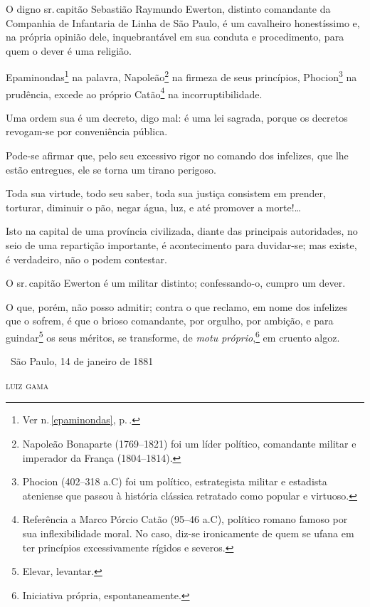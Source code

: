 O digno sr.\,capitão Sebastião Raymundo Ewerton, distinto comandante da
Companhia de Infantaria de Linha de São Paulo, é um cavalheiro
honestíssimo e, na própria opinião dele, inquebrantável em sua conduta e
procedimento, para quem o dever é uma religião.

Epaminondas\footnote{Ver n.\,\ref{epaminondas}, p.\,\pageref{epaminondas}.} na palavra, Napoleão\footnote{Napoleão Bonaparte 
  (1769--1821) foi um líder político, comandante militar e imperador da
  França (1804--1814).} na firmeza de seus princípios, Phocion\footnote{
  Phocion (402--318 a.C) foi um político, estrategista militar e
  estadista ateniense que passou à história clássica retratado como
  popular e virtuoso.} na prudência, excede ao próprio Catão\footnote{
  Referência a Marco Pórcio Catão (95--46 a.C), político romano famoso
  por sua inflexibilidade moral. No caso, diz-se ironicamente de quem se
  ufana em ter princípios excessivamente rígidos e severos.} na
incorruptibilidade.

Uma ordem sua é um decreto, digo mal: é uma lei sagrada, porque os
decretos revogam-se por conveniência pública.

Pode-se afirmar que, pelo seu excessivo rigor no comando dos infelizes,
que lhe estão entregues, ele se torna um tirano perigoso.

Toda sua virtude, todo seu saber, toda sua justiça consistem em prender,
torturar, diminuir o pão, negar água, luz, e até promover a
morte!\ldots{}

Isto na capital de uma província civilizada, diante das principais
autoridades, no seio de uma repartição importante, é acontecimento para
duvidar-se; mas existe, é verdadeiro, não o podem contestar.

O sr.\,capitão Ewerton é um militar distinto; confessando-o, cumpro um
dever.

O que, porém, não posso admitir; contra o que reclamo, em nome dos
infelizes que o sofrem, é que o brioso comandante, por orgulho, por
ambição, e para guindar\footnote{Elevar, levantar.} os seus méritos,
se transforme, de \emph{motu próprio},\footnote{Iniciativa
  própria, espontaneamente.} em cruento algoz.

\medskip
\hfill\ São Paulo, 14 de janeiro de 1881

\hfill\textsc{luiz gama}

